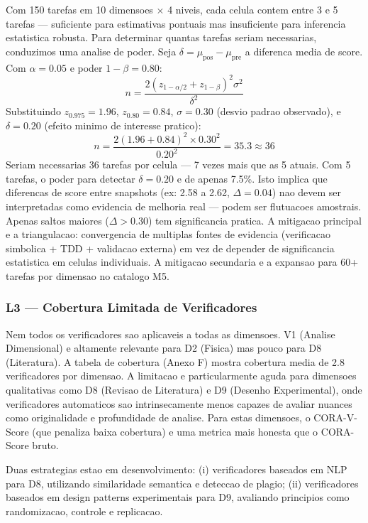 Com 150 tarefas em 10 dimensoes $\times$ 4 niveis, cada celula contem
entre 3 e 5 tarefas --- suficiente para estimativas pontuais mas
insuficiente para inferencia estatistica robusta. Para determinar quantas
tarefas seriam necessarias, conduzimos uma analise de poder. Seja
$\delta = \mu_{\text{pos}} - \mu_{\text{pre}}$ a diferenca media de
score. Com $\alpha = 0.05$ e poder $1-\beta = 0.80$:
\[
n = \frac{2(z_{1-\alpha/2} + z_{1-\beta})^2 \sigma^2}{\delta^2}
\]
Substituindo $z_{0.975}=1.96$, $z_{0.80}=0.84$, $\sigma=0.30$ (desvio
padrao observado), e $\delta=0.20$ (efeito minimo de interesse pratico):
\[
n = \frac{2(1.96 + 0.84)^2 \times 0.30^2}{0.20^2} = 35.3 \approx 36
\]
Seriam necessarias 36 tarefas por celula --- 7 vezes mais que as 5
atuais. Com 5 tarefas, o poder para detectar $\delta=0.20$ e de apenas
7.5\%. Isto implica que diferencas de score entre snapshots (ex: 2.58 a
2.62, $\Delta=0.04$) nao devem ser interpretadas como evidencia de
melhoria real --- podem ser flutuacoes amostrais. Apenas saltos maiores
($\Delta > 0.30$) tem significancia pratica. A mitigacao principal e a
triangulacao: convergencia de multiplas fontes de evidencia
(verificacao simbolica + TDD + validacao externa) em vez de depender de
significancia estatistica em celulas individuais. A mitigacao secundaria
e a expansao para 60+ tarefas por dimensao no catalogo M5.

\subsubsection{L3 --- Cobertura Limitada de Verificadores}

Nem todos os verificadores sao aplicaveis a todas as dimensoes. V1
(Analise Dimensional) e altamente relevante para D2 (Fisica) mas pouco
para D8 (Literatura). A tabela de cobertura (Anexo F) mostra cobertura
media de 2.8 verificadores por dimensao. A limitacao e particularmente
aguda para dimensoes qualitativas como D8 (Revisao de Literatura) e D9
(Desenho Experimental), onde verificadores automaticos sao intrinsecamente
menos capazes de avaliar nuances como originalidade e profundidade de
analise. Para estas dimensoes, o CORA-V-Score (que penaliza baixa
cobertura) e uma metrica mais honesta que o CORA-Score bruto.

Duas estrategias estao em desenvolvimento: (i) verificadores baseados em
NLP para D8, utilizando similaridade semantica e deteccao de plagio; (ii)
verificadores baseados em design patterns experimentais para D9,
avaliando principios como randomizacao, controle e replicacao.

